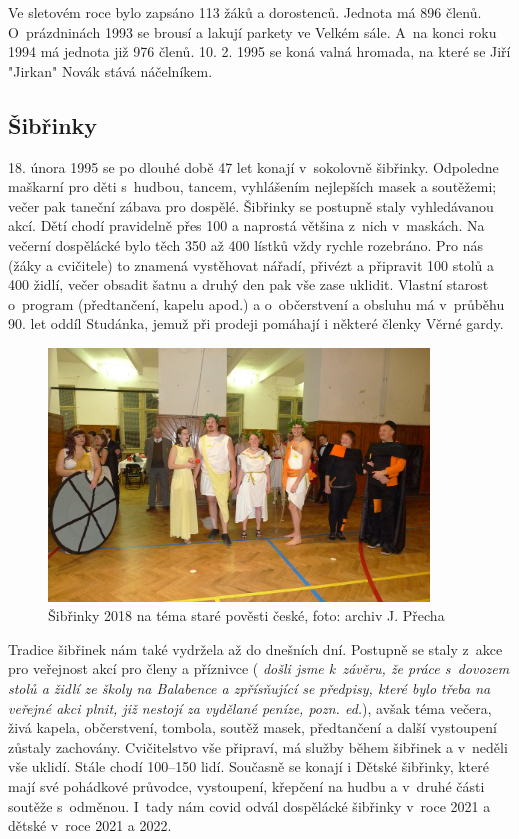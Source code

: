 \documentclass[a5paper, 11pt, twoside]{article}
\newcommand{\pozned}[1]{%
\textit{#1}}
\begin{document}
Ve sletovém roce bylo zapsáno 113 žáků a dorostenců. Jednota má 896
členů. O~prázdninách 1993 se brousí a lakují parkety ve Velkém sále.
A~na konci roku 1994 má jednota již 976 členů. 10. 2. 1995 se koná valná
hromada, na které se Jiří "Jirkan" Novák stává náčelníkem.

\subsection{Šibřinky}

18. února 1995 se po dlouhé době 47 let konají v~sokolovně šibřinky.
Odpoledne maškarní pro děti s~hudbou, tancem, vyhlášením nejlepších
masek a soutěžemi; večer pak taneční zábava pro dospělé. Šibřinky se
postupně staly vyhledávanou akcí. Dětí chodí pravidelně přes 100 a
naprostá většina z~nich v~maskách. Na večerní dospělácké bylo těch 350
až 400 lístků vždy rychle rozebráno. Pro nás (žáky a cvičitele) to
znamená vystěhovat nářadí, přivézt a připravit 100 stolů a 400 židlí,
večer obsadit šatnu a druhý den pak vše zase uklidit. Vlastní starost
o~program (předtančení, kapelu apod.) a o~občerstvení a obsluhu má
v~průběhu 90. let oddíl Studánka, jemuž při prodeji pomáhají i některé
členky Věrné gardy.

\begin{figure}[h!]
  \centering 
  \includegraphics[width=0.9\textwidth]{img/45_sibrinky.JPG}
  \caption*{Šibřinky 2018 na téma staré pověsti české, foto: archiv J. Přecha}
\end{figure}

Tradice šibřinek nám také vydržela až do dnešních dní. Postupně se staly
z~akce pro veřejnost akcí pro členy a příznivce (\pozned{došli jsme
k~závěru, že práce s~dovozem stolů a židlí ze školy na Balabence a
zpřísňující se předpisy, které bylo třeba na veřejné akci plnit, již
nestojí za vydělané peníze, pozn. ed.}), avšak téma večera, živá kapela,
občerstvení, tombola, soutěž masek, předtančení a další vystoupení
zůstaly zachovány. Cvičitelstvo vše připraví, má služby během šibřinek a
v~neděli vše uklidí. Stále chodí 100--150 lidí. Současně se konají i
Dětské šibřinky, které mají své pohádkové průvodce, vystoupení, křepčení
na hudbu a v~druhé části soutěže s~odměnou. I~tady nám covid odvál
dospělácké šibřinky v~roce 2021 a dětské v~roce 2021 a 2022.
\end{document}
